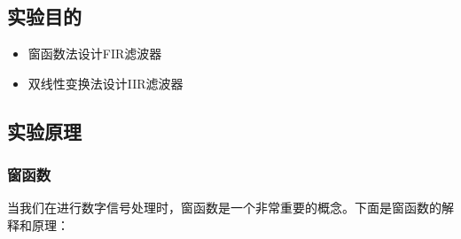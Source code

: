 \documentclass[a4paper,12pt]{article}
\begin{document}
\subsection{实验目的}
\begin{itemize}
    \item 窗函数法设计FIR滤波器
    \item 双线性变换法设计IIR滤波器\cite{ning2012}
\end{itemize}


\subsection{实验原理}
\subsubsection{窗函数}
当我们在进行数字信号处理时，窗函数是一个非常重要的概念。下面是窗函数的解释和原理：
\end{document}
